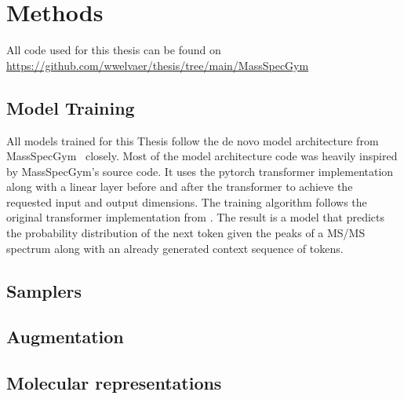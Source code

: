 \chapter{Methods}
\label{chap:methods}

All code used for this thesis can be found on \url{https://github.com/wwelvaer/thesis/tree/main/MassSpecGym}

\section{Model Training}
\label{sec:training}

All models trained for this Thesis follow the de novo model architecture from MassSpecGym~\cite{bushuiev2024massspecgym} closely.
Most of the model architecture code was heavily inspired by MassSpecGym's source code.
It uses the pytorch transformer implementation along with a linear layer before and after the transformer to achieve the requested input and output dimensions.
The training algorithm follows the original transformer implementation from \textcite{vaswani2017attention}.
The result is a model that predicts the probability distribution of the next token given the peaks of a \ac{MS/MS} spectrum along with an already generated context sequence of tokens.




\section{Samplers}
\label{sec:samplers}

\section{Augmentation}
\label{sec:augmentation}

\section{Molecular representations}
\label{sec:representations}
